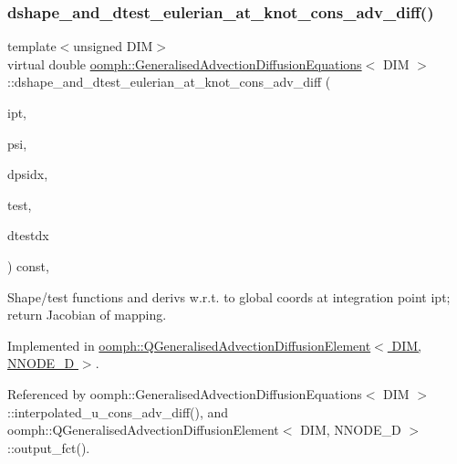\subsubsection{\texorpdfstring{dshape\+\_\+and\+\_\+dtest\+\_\+eulerian\+\_\+at\+\_\+knot\+\_\+cons\+\_\+adv\+\_\+diff()}{dshape\_and\_dtest\_eulerian\_at\_knot\_cons\_adv\_diff()}}
{\footnotesize\ttfamily template$<$unsigned D\+IM$>$ \\
virtual double \hyperlink{classoomph_1_1GeneralisedAdvectionDiffusionEquations}{oomph\+::\+Generalised\+Advection\+Diffusion\+Equations}$<$ D\+IM $>$\+::dshape\+\_\+and\+\_\+dtest\+\_\+eulerian\+\_\+at\+\_\+knot\+\_\+cons\+\_\+adv\+\_\+diff (\begin{DoxyParamCaption}\item[{const unsigned \&}]{ipt,  }\item[{\hyperlink{classoomph_1_1Shape}{Shape} \&}]{psi,  }\item[{\hyperlink{classoomph_1_1DShape}{D\+Shape} \&}]{dpsidx,  }\item[{\hyperlink{classoomph_1_1Shape}{Shape} \&}]{test,  }\item[{\hyperlink{classoomph_1_1DShape}{D\+Shape} \&}]{dtestdx }\end{DoxyParamCaption}) const\hspace{0.3cm}{\ttfamily [protected]}, {}}



Shape/test functions and derivs w.\+r.\+t. to global coords at integration point ipt; return Jacobian of mapping. 



Implemented in \hyperlink{classoomph_1_1QGeneralisedAdvectionDiffusionElement_a86385db741884733eb3ec459cc40290d}{oomph\+::\+Q\+Generalised\+Advection\+Diffusion\+Element$<$ D\+I\+M, N\+N\+O\+D\+E\+\_\+D $>$}.



Referenced by oomph\+::\+Generalised\+Advection\+Diffusion\+Equations$<$ D\+I\+M $>$\+::interpolated\+\_\+u\+\_\+cons\+\_\+adv\+\_\+diff(), and oomph\+::\+Q\+Generalised\+Advection\+Diffusion\+Element$<$ D\+I\+M, N\+N\+O\+D\+E\+\_\+D $>$\+::output\+\_\+fct().

\mbox{\label{classoomph_1_1GeneralisedAdvectionDiffusionEquations_a7d1b7d414a32173038a7b31b65ff5e8a}} 
